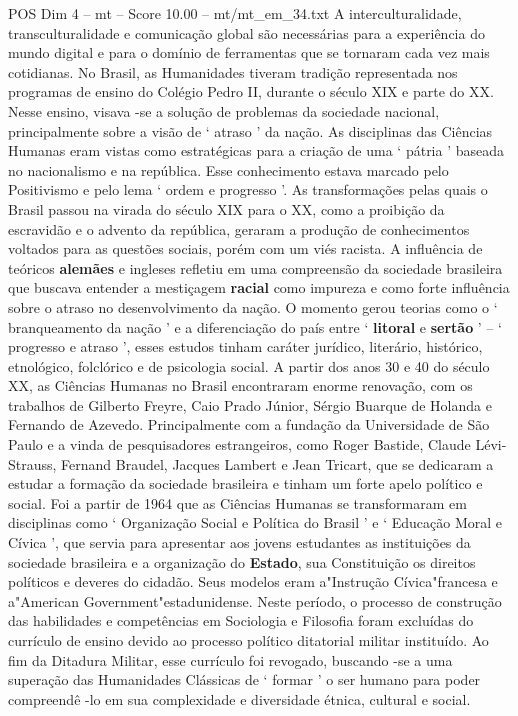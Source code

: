 \begin{textsample}{POS Dim 4 – mt – Score 10.00 – mt/mt\_em\_34.txt}
A interculturalidade, transculturalidade e comunicação global são necessárias para a experiência do mundo digital e para o domínio de ferramentas que se tornaram cada vez mais cotidianas.
No Brasil, as Humanidades tiveram tradição representada nos programas de ensino do Colégio Pedro II, durante o século XIX e parte do XX.
Nesse ensino, visava -se a solução de problemas da sociedade nacional, principalmente sobre a visão de ‘ atraso ’ da nação.
As disciplinas das Ciências Humanas eram vistas como estratégicas para a criação de uma ‘ pátria ’ baseada no nacionalismo e na república.
Esse conhecimento estava marcado pelo Positivismo e pelo lema ‘ ordem e progresso ’.
As transformações pelas quais o Brasil passou na virada do século XIX para o XX, como a proibição da escravidão e o advento da república, geraram a produção de conhecimentos voltados para as questões sociais, porém com um viés racista.
A influência de teóricos \textbf{alemães} e ingleses refletiu em uma compreensão da sociedade brasileira que buscava entender a mestiçagem \textbf{racial} como impureza e como forte influência sobre o atraso no desenvolvimento da nação.
O momento gerou teorias como o ‘ branqueamento da nação ’ e a diferenciação do país entre ‘ \textbf{litoral} e \textbf{sertão} ’ – ‘ progresso e atraso ’, esses estudos tinham caráter jurídico, literário, histórico, etnológico, folclórico e de psicologia social.
A partir dos anos 30 e 40 do século XX, as Ciências Humanas no Brasil encontraram enorme renovação, com os trabalhos de Gilberto Freyre, Caio Prado Júnior, Sérgio Buarque de Holanda e Fernando de Azevedo.
Principalmente com a fundação da Universidade de São Paulo e a vinda de pesquisadores estrangeiros, como Roger Bastide, Claude Lévi-Strauss, Fernand Braudel, Jacques Lambert e Jean Tricart, que se dedicaram a estudar a formação da sociedade brasileira e tinham um forte apelo político e social.
Foi a partir de 1964 que as Ciências Humanas se transformaram em disciplinas como ‘ Organização Social e Política do Brasil ’ e ‘ Educação Moral e Cívica ’, que servia para apresentar aos jovens estudantes as instituições da sociedade brasileira e a organização do \textbf{Estado}, sua Constituição os direitos políticos e deveres do cidadão.
Seus modelos eram a"Instrução Cívica"francesa e a"American Government"estadunidense.
Neste período, o processo de construção das habilidades e competências em Sociologia e Filosofia foram excluídas do currículo de ensino devido ao processo político ditatorial militar instituído.
Ao fim da Ditadura Militar, esse currículo foi revogado, buscando -se a uma superação das Humanidades Clássicas de ‘ formar ’ o ser humano para poder compreendê -lo em sua complexidade e diversidade étnica, cultural e social.

\end{textsample}
